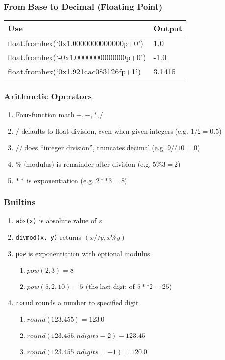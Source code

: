 \documentclass{beamer}
\begin{document}
\begin{frame}
  \frametitle{From Base to Decimal (Floating Point)}

  \begin{table}
    \begin{tabular}{l | l}
    Use          & Output   \\
    \hline
    float.fromhex(`0x1.0000000000000p+0')    &  1.0    \\
    float.fromhex(`-0x1.0000000000000p+0')   & -1.0    \\
    float.fromhex(`0x1.921cac083126fp+1')    &  3.1415 \\
    \end{tabular}
  \end{table}
\end{frame}

\begin{frame}
  \frametitle{Arithmetic Operators}

  \begin{enumerate}
  \item Four-function math $+, -, *, /$
  \item $/$ defaults to float division, even when given integers (e.g. $1/2=0.5$)
  \item $//$ does ``integer division'', truncates decimal (e.g. $9//10=0$)
  \item $\%$ (modulus) is remainder after division (e.g. $5 \% 3 = 2$)
  \item $**$ is exponentiation (e.g. $2**3=8$)
  \end{enumerate}
\end{frame}

\begin{frame}
  \frametitle{Builtins}

  \begin{enumerate}
  \item \texttt{abs(x)} is absolute value of $x$
  \item \texttt{divmod(x, y)} returns $(x//y, x \% y)$
  \item \texttt{pow} is exponentiation with optional modulus
    \begin{enumerate}
      \item $pow(2, 3) = 8$
      \item $pow(5, 2, 10) = 5$ (the last digit of $5**2=25$)
    \end{enumerate}
  \item \texttt{round} rounds a number to specified digit
    \begin{enumerate}
      \item $round(123.455) = 123.0$
      \item $round(123.455, ndigits=2) = 123.45$
      \item $round(123.455, ndigits=-1) = 120.0$
    \end{enumerate}
  \end{enumerate}
\end{frame}
\end{document}
